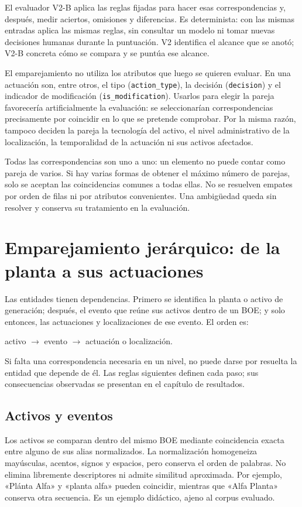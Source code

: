 El evaluador V2-B aplica las reglas fijadas para hacer esas correspondencias
y, después, medir aciertos, omisiones y diferencias. Es determinista: con las
mismas entradas aplica las mismas reglas, sin consultar un modelo ni tomar
nuevas decisiones humanas durante la puntuación. V2 identifica el alcance
que se anotó; V2-B concreta cómo se compara y se puntúa ese alcance.

El emparejamiento no utiliza los atributos que luego se quieren evaluar.
En una actuación son, entre otros, el tipo (\texttt{action\_type}), la decisión
(\texttt{decision}) y el indicador de modificación (\texttt{is\_modification}).
Usarlos para elegir la pareja favorecería artificialmente la evaluación:
se seleccionarían correspondencias precisamente por coincidir en lo que se
pretende comprobar. Por la misma razón, tampoco deciden la pareja la
tecnología del activo, el nivel administrativo de la localización, la
temporalidad de la actuación ni sus activos afectados.

Todas las correspondencias son uno a uno: un elemento no puede contar como
pareja de varios. Si hay varias formas de obtener el máximo número de
parejas, solo se aceptan las coincidencias comunes a todas ellas. No se
resuelven empates por orden de filas ni por atributos convenientes. Una
ambigüedad queda sin resolver y conserva su tratamiento en la evaluación.

\section{Emparejamiento jerárquico: de la planta a sus actuaciones}
\label{sec:matching-jerarquico}
Las entidades tienen dependencias. Primero se identifica la planta o activo
de generación; después, el evento que reúne sus activos dentro de un BOE;
y solo entonces, las actuaciones y localizaciones de ese evento. El orden es:
\begin{center}
activo $\longrightarrow$ evento $\longrightarrow$ actuación o localización.
\end{center}
Si falta una correspondencia necesaria en un nivel, no puede darse por
resuelta la entidad que depende de él. Las reglas siguientes definen cada
paso; sus consecuencias observadas se presentan en el capítulo de resultados.

\subsection{Activos y eventos}
Los activos se comparan dentro del mismo BOE mediante coincidencia exacta
entre alguno de sus alias normalizados. La normalización homogeneiza
mayúsculas, acentos, signos y espacios, pero conserva el orden de palabras.
No elimina libremente descriptores ni admite similitud aproximada. Por
ejemplo, «Plánta Alfa» y «planta alfa» pueden coincidir, mientras que
«Alfa Planta» conserva otra secuencia. Es un ejemplo didáctico, ajeno al
corpus evaluado.

